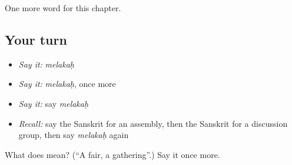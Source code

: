 \begin{grammarlens}[title={What you've built}]
One more word for this chapter.
\end{grammarlens}

\subsection*{Your turn}
\begin{itemize}
\raggedright
  \item \emph{Say it:} \emph{melakaḥ}
  \item \emph{Say it:} \emph{melakaḥ}, once more
  \item \emph{Say it:} say \emph{melakaḥ}
  \item \emph{Recall:} say the Sanskrit for an assembly, then the Sanskrit for a discussion group, then say \emph{melakaḥ} again
\end{itemize}

\begin{tcolorbox}[breakable,colback=teal!4,colframe=teal!35!black,title={Before you move on}]
What does  mean? (\textquotedblleft{}A fair, a gathering\textquotedblright{}.) Say it once more.
\end{tcolorbox}
